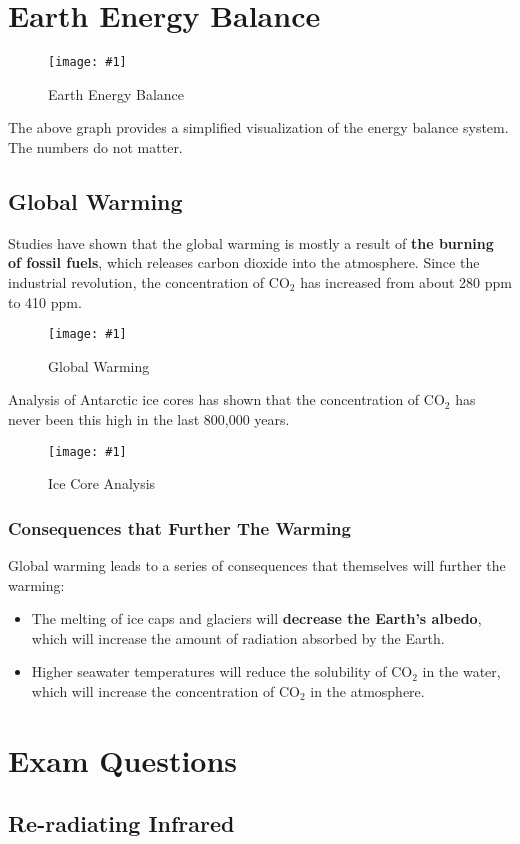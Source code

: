 \documentclass[a4paper,12pt]{article}
\let\oldsection\section
\renewcommand\section{\clearpage\oldsection}
\newcommand{\img}[4]{\begin{center}
  \begin{figure}[H]
    \centering
    \texttt{[image: \#1]}
    \caption{#3}
    \label{fig:#4}
  \end{figure}
\end{center}}
\begin{document}
\section{Earth Energy Balance}

\img{systemsummary.png}{1}{Earth Energy Balance}{systemsummary}

The above graph provides a simplified visualization of the energy balance system. The numbers do not matter.

\pagebreak

\subsection{Global Warming}

Studies have shown that the global warming is mostly a result of \textbf{the burning of fossil fuels}, which releases carbon dioxide into the atmosphere. Since the industrial revolution, the concentration of CO$_2$ has increased from about 280 ppm to 410 ppm.

\img{env.png}{0.8}{Global Warming}{env}

Analysis of Antarctic ice cores has shown that the concentration of CO$_2$ has never been this high in the last 800,000 years.

\img{icecore.png}{0.8}{Ice Core Analysis}{icecore}

\pagebreak

\subsubsection{Consequences that Further The Warming}

Global warming leads to a series of consequences that themselves will further the warming:
\begin{itemize}
  \item The melting of ice caps and glaciers will \textbf{decrease the Earth's albedo}, which will increase the amount of radiation absorbed by the Earth.
  \item Higher seawater temperatures will reduce the solubility of CO$_2$ in the water, which will increase the concentration of CO$_2$ in the atmosphere.
\end{itemize}

\section{Exam Questions}

\subsection{Re-radiating Infrared}
\end{document}
